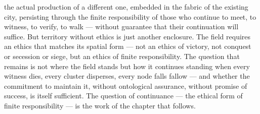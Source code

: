 the actual production of a different one, embedded in the fabric of the existing city, persisting through the finite responsibility of those who continue to meet, to witness, to verify, to walk — without guarantee that their continuation will suffice. But territory without ethics is just another enclosure. The field requires an ethics that matches its spatial form — not an ethics of victory, not conquest or secession or siege, but an ethics of finite responsibility. The question that remains is not where the field stands but how it continues standing when every witness dies, every cluster disperses, every node falls fallow — and whether the commitment to maintain it, without ontological assurance, without promise of success, is itself sufficient. The question of continuance — the ethical form of finite responsibility — is the work of the chapter that follows.
